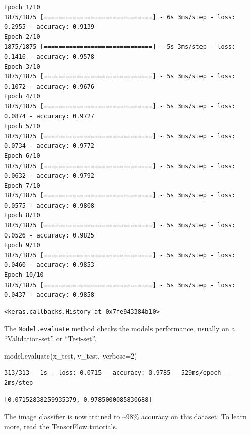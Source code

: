 \documentclass[
  letterpaper,
  DIV=11,
  numbers=noendperiod]{scrreprt}
\newenvironment{Shaded}{\begin{snugshade}}{\end{snugshade}}
\newcommand{\DecValTok}[1]{\textcolor[rgb]{0.68,0.00,0.00}{#1}}
\newcommand{\NormalTok}[1]{\textcolor[rgb]{0.00,0.23,0.31}{#1}}
\newcommand{\OperatorTok}[1]{\textcolor[rgb]{0.37,0.37,0.37}{#1}}
\begin{document}
\begin{verbatim}
Epoch 1/10
1875/1875 [==============================] - 6s 3ms/step - loss: 0.2955 - accuracy: 0.9139
Epoch 2/10
1875/1875 [==============================] - 5s 3ms/step - loss: 0.1416 - accuracy: 0.9578
Epoch 3/10
1875/1875 [==============================] - 5s 3ms/step - loss: 0.1072 - accuracy: 0.9676
Epoch 4/10
1875/1875 [==============================] - 5s 3ms/step - loss: 0.0874 - accuracy: 0.9727
Epoch 5/10
1875/1875 [==============================] - 5s 3ms/step - loss: 0.0734 - accuracy: 0.9772
Epoch 6/10
1875/1875 [==============================] - 5s 3ms/step - loss: 0.0632 - accuracy: 0.9792
Epoch 7/10
1875/1875 [==============================] - 5s 3ms/step - loss: 0.0575 - accuracy: 0.9808
Epoch 8/10
1875/1875 [==============================] - 5s 3ms/step - loss: 0.0526 - accuracy: 0.9825
Epoch 9/10
1875/1875 [==============================] - 5s 3ms/step - loss: 0.0460 - accuracy: 0.9853
Epoch 10/10
1875/1875 [==============================] - 5s 3ms/step - loss: 0.0437 - accuracy: 0.9858
\end{verbatim}

\begin{verbatim}
<keras.callbacks.History at 0x7fe943384b10>
\end{verbatim}

The \texttt{Model.evaluate} method checks the models performance,
usually on a
``\href{https://developers.google.com/machine-learning/glossary\#validation-set}{Validation-set}''
or
``\href{https://developers.google.com/machine-learning/glossary\#test-set}{Test-set}''.

\begin{Shaded}
\begin{Highlighting}[]
\NormalTok{model.evaluate(x\_test,  y\_test, verbose}\OperatorTok{=}\DecValTok{2}\NormalTok{)}
\end{Highlighting}
\end{Shaded}

\begin{verbatim}
313/313 - 1s - loss: 0.0715 - accuracy: 0.9785 - 529ms/epoch - 2ms/step
\end{verbatim}

\begin{verbatim}
[0.07152838259935379, 0.9785000085830688]
\end{verbatim}

The image classifier is now trained to \textasciitilde98\% accuracy on
this dataset. To learn more, read the
\href{https://www.tensorflow.org/tutorials/}{TensorFlow tutorials}.
\end{document}
